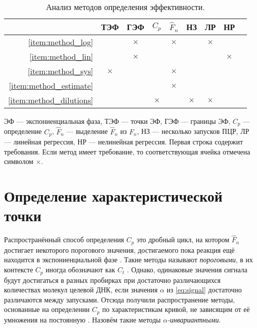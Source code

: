 \begin{table}
  {
    \centering
    \begin{tabular}{r|cccccccc}
                                  & ТЭФ      & ГЭФ      & $C_{p}$  & $\hat F_{n}$ & НЗ       & ЛР       & НР       \\\hline
      \ref{item:method_log}       &          & $\times$ &          & $\times$     &          & $\times$ &          \\
      \ref{item:method_lin}       &          & $\times$ &          &              &          &          & $\times$ \\
      \ref{item:method_sys}       & $\times$ &          &          & $\times$     &          &          &          \\
      \ref{item:method_estimate}  &          &          &          & $\times$     &          &          &          \\
      \ref{item:method_dilutions} &          &          & $\times$ &              & $\times$ & $\times$ &
    \end{tabular}
    \caption{Анализ методов определения эффективности.}
    \label{table:eff_analysis}
  }

  ЭФ --- экспониенциальная фаза, ТЭФ --- точки ЭФ, ГЭФ --- границы ЭФ, $C_{p}$
  --- определение $C_{p}$, $\hat F_{n}$ --- выделение $\hat F_{n}$ из
  $F_{n}$, НЗ --- несколько запусков ПЦР, ЛР --- линейная регрессия, НР ---
  нелинейная регрессия. Первая строка содержит требования. Если метод имеет
  требование, то соответствующая ячейка отмечена символом $\times$.
\end{table}

\section{Определение характеристической точки}\label{sec:cp}

Распространённый способ определения $C_{p}$ это дробный цикл, на котором
$\hat F_{n}$ достигает некоторого порогового значения, достигаемого пока
реакция ещё находится в экспониенциальной фазе
\cite{larionovStandardCurveBased2005,rasmussenQuantificationLightCycler2001}.
Такие методы называют {\it пороговыми}, в их контексте $C_{p}$ иногда
обозначают как $C_{t}$
\cite{kubistaRealtimePolymeraseChain2006,liuNewQuantitativeMethod2002}. Однако,
одинаковые значения сигнала будут достигаться в разных пробирках при достаточно
различающихся количествах молекул целевой ДНК, если значения $\alpha$ из
\eqref{eq:signal} достаточно различаются между запусками. Отсюда получили
распространение методы, основанные на определении $C_{p}$ по характеристикам
кривой, не зависящим от её умножения на постоянную
\cite{rebrikovRealtimePCRReview2006}. Назовём такие методы
{\it $\alpha$-инвариантными}.

